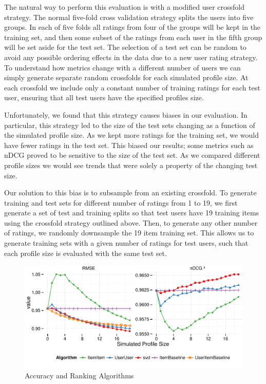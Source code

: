 \documentclass[letterpaper]{sig-alternate}
\begin{document}
  The natural way to perform this evaluation is with a modified user crossfold strategy.
  The normal five-fold cross validation strategy splits the users into five groups.
  In each of five folds all ratings from four of the groups will be kept in the training set, and then some subset of the ratings from each user in the fifth group will be set aside for the test set.
  The selection of a test set can be random to avoid any possible ordering effects in the data due to a new user rating strategy.
  To understand how metrics change with a different number of users we can simply generate separate random crossfolds for each simulated profile size.
  At each crossfold we include only a constant number of training ratings for each test user, ensuring that all test users have the specified profiles size.
  
  Unfortunately, we found that this strategy causes biases in our evaluation.
  In particular, this strategy led to the size of the test sets changing as a function of the simulated profile size.
  As we kept more ratings for the training set, we would have fewer ratings in the test set.
  This biased our results; some metrics such as nDCG proved to be sensitive to the size of the test set.
  As we compared different profile sizes we would see trends that were solely a property of the changing test size.
  
  Our solution to this bias is to subsample from an existing crossfold.
  To generate training and test sets for different number of ratings from 1 to 19, we first generate a set of test and training splits so that test users have 19 training items using the crossfold strategy outlined above.
  Then, to generate any other number of ratings, we randomly downsample the 19 item training set.
  This allows us to generate training sets with a given number of ratings for test users, such that each profile size is evaluated with the same test set.


\begin{figure}[ht!]
  \centering
  \includegraphics[width=0.75\linewidth]{../lenskit/output/ekstrandTuned20/accuracy.pdf}
  \caption{Accuracy and Ranking Algorithms}
  \label{fig:rmse}
  \label{fig:ndcg}
\end{figure}
\end{document}
